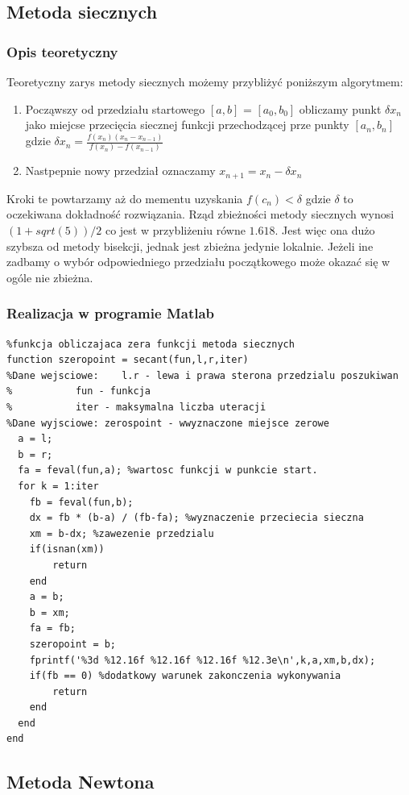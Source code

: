 \documentclass[a4paper, 11pt]{article}
\begin{document}
\subsection{Metoda siecznych}
\subsubsection{Opis teoretyczny}
Teoretyczny zarys metody siecznych możemy przybliżyć poniższym algorytmem:
\begin{enumerate}
  \item Począwszy od przedziału startowego $[a,b]$ = $[a_{0},b_{0}]$ obliczamy punkt $\delta x_{n}$ jako miejcse przecięcia siecznej funkcji przechodzącej prze punkty $[a_{n},b_{n}]$ gdzie $\delta x_{n}=\frac{f(x_{n})(x_{n}-x_{n-1})}{f(x_{n})-f(x_{n-1})}$
  \item Nastpepnie nowy przedział oznaczamy $x_{n+1}=x_{n}-\delta x_{n}$ 
\end{enumerate} 
Kroki te powtarzamy aż do mementu uzyskania $f(c_{n})<\delta$ gdzie $\delta$ to oczekiwana dokładność rozwiązania. Rząd zbieżności metody siecznych wynosi $(1+sqrt(5))/2$ co jest w przybliżeniu równe $1.618$. 
Jest więc ona dużo szybsza od metody bisekcji, jednak jest zbieżna jedynie lokalnie. Jeżeli ine zadbamy o wybór odpowiedniego przedziału początkowego może okazać się w ogóle nie zbieżna.


\subsubsection{Realizacja w programie Matlab}
\begin{lstlisting}
%funkcja obliczajaca zera funkcji metoda siecznych
function szeropoint = secant(fun,l,r,iter)
%Dane wejsciowe:	l.r - lewa i prawa sterona przedzialu poszukiwan
%			fun - funkcja 
%			iter - maksymalna liczba uteracji
%Dane wyjsciowe: zerospoint - wwyznaczone miejsce zerowe
  a = l;
  b = r;
  fa = feval(fun,a); %wartosc funkcji w punkcie start.
  for k = 1:iter
    fb = feval(fun,b);
    dx = fb * (b-a) / (fb-fa); %wyznaczenie przeciecia sieczna
    xm = b-dx; %zawezenie przedzialu
    if(isnan(xm))
        return
    end
    a = b;
    b = xm;
    fa = fb;
    szeropoint = b;
    fprintf('%3d %12.16f %12.16f %12.16f %12.3e\n',k,a,xm,b,dx);
    if(fb == 0) %dodatkowy warunek zakonczenia wykonywania
        return
    end
  end
end
\end{lstlisting}

\subsection{Metoda Newtona}
\end{document}
